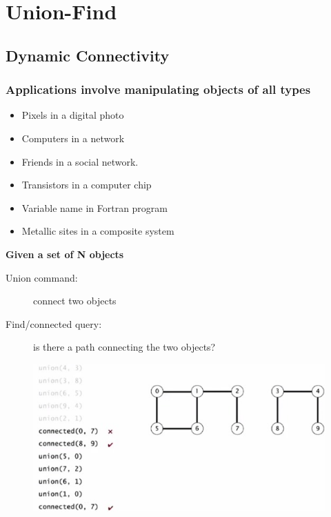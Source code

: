 
\chapter{Union-Find}

\section{Dynamic Connectivity}
\subsection{Applications involve manipulating objects of all types}
\begin{itemize}
 \item Pixels in a digital photo
 \item Computers in a network
 \item Friends in a social network.
 \item Transistors in a computer chip
 \item Variable name in Fortran program
 \item Metallic sites in a composite system
\end{itemize}

\vspace{10 mm}

\textbf{Given a set of N objects}
\begin{description}
  \item[Union command:] connect two objects
  \item[Find/connected query:] is there a path connecting the two objects?
\end{description}

\begin{figure}[h]
   \centering
\includegraphics[scale=0.4]{tex_files/images/dynamicconnectivity.jpg}
\end{figure}



